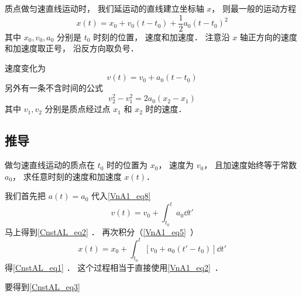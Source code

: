 
\begin{issues}
\issueTODO
\end{issues}


质点做匀速直线运动时， 我们延运动的直线建立坐标轴 $x$， 则最一般的运动方程
\begin{equation}\label{CnstAL_eq1}
x(t) = x_0 + v_0 (t - t_0) +  \frac12 a_0 (t - t_0)^2
\end{equation}
其中 $x_0, v_0, a_0$ 分别是 $t_0$ 时刻的位置， 速度和加速度． 注意沿 $x$ 轴正方向的速度和加速度取正号， 沿反方向取负号．

速度变化为
\begin{equation}\label{CnstAL_eq2}
v(t) = v_0 + a_0 (t - t_0)
\end{equation}
另外有一条不含时间的公式
\begin{equation}\label{CnstAL_eq3}
v_2^2 - v_1^2 = 2a_0 (x_2 - x_1)
\end{equation}
其中 $v_1, v_2$ 分别是质点经过点 $x_1$ 和 $x_2$ 时的速度．


\subsection{推导}
做匀速直线运动的质点在 $t_0$ 时的位置为 $x_0$， 速度为 $v_0$， 且加速度始终等于常数 $a_0$， 求任意时刻的速度和加速度 $x(t)$．

我们首先把 $a(t) = a_0$ 代入\autoref{VnA1_eq8}~
\begin{equation}
v(t) = v_0 + \int_{t_0}^t a_0 \dd{t'}
\end{equation}
马上得到\autoref{CnstAL_eq2} ． 再次积分（\autoref{VnA1_eq5}~）
\begin{equation}
x(t) = x_0 + \int_{t_0}^t [v_0 + a_0 (t' - t_0)] \dd{t'}
\end{equation}
得\autoref{CnstAL_eq1} ． 这个过程相当于直接使用\autoref{VnA1_eq2}~．

要得到\autoref{CnstAL_eq3} 